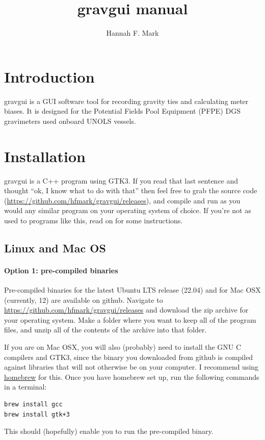 \documentclass{pfpe-manual}
\title{gravgui manual}
\author{Hannah F. Mark}
\begin{document}
\maketitle

\tableofcontents
\newpage

\section{Introduction}

gravgui is a GUI software tool for recording gravity ties and calculating meter biases. It is designed for the Potential Fields Pool Equipment (PFPE) DGS gravimeters used onboard UNOLS vessels.

\section{Installation}
\label{install}
gravgui is a C++ program using GTK3. If you read that last sentence and thought ``ok, I know what to do with that'' then feel free to grab the source code (\url{https://github.com/hfmark/gravgui/releases}), and compile and run as you would any similar program on your operating system of choice. If you're not as used to programs like this, read on for some instructions.

\subsection{Linux and Mac OS}
\label{inst:unix}
\paragraph{Option 1: pre-compiled binaries}
Pre-compiled binaries for the latest Ubuntu LTS release (22.04) and for Mac OSX (currently, 12) are available on github. Navigate to \url{https://github.com/hfmark/gravgui/releases} and download the zip archive for your operating system. Make a folder where you want to keep all of the program files, and unzip all of the contents of the archive into that folder.

If you are on Mac OSX, you will also (probably) need to install the GNU C compilers and GTK3, since the binary you downloaded from github is compiled against libraries that will not otherwise be on your computer. I recommend using \href{https://brew.sh/}{homebrew} for this. Once you have homebrew set up, run the following commands in a terminal:
\begin{verbatim}
brew install gcc
brew install gtk+3
\end{verbatim}
This should (hopefully) enable you to run the pre-compiled binary.
\end{document}
